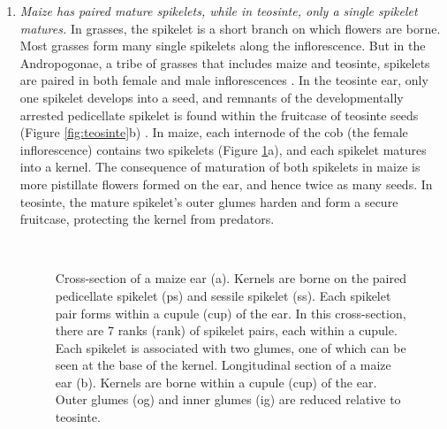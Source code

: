 \documentclass[a4paper]{article}
\begin{document}
\begin{enumerate}

﻿ \item \textit{Maize has paired mature spikelets, while in teosinte, only a single spikelet matures.}
 In grasses, the spikelet is a short branch on which flowers are borne.
 Most grasses form many single spikelets along the inflorescence.
 But in the Andropogonae, a tribe of grasses that includes maize and teosinte, spikelets are paired in both female and male inflorescences \citep{kellogg2000, wu2009}.
﻿In the teosinte ear, only one spikelet develops into a seed, and remnants of the developmentally arrested pedicellate spikelet is found within the fruitcase of teosinte seeds (Figure \ref{fig:teosinte}b) \citep{weatherwax1935, sundberg1990, doebley1995sos1}.
 In maize, each internode of the cob (the female inflorescence) contains two spikelets (Figure \ref{fig:maize}a), and each spikelet matures into a kernel.
 The consequence of maturation of both spikelets in maize is more pistillate flowers formed on the ear, and hence twice as many seeds.
 In teosinte, the mature spikelet's outer glumes harden and form a secure fruitcase, protecting the  kernel from predators.

﻿   \begin{figure}
        \caption{\label{fig:maize} Cross-section of a maize ear (a). Kernels are borne on the paired pedicellate spikelet (ps) and sessile spikelet (ss). Each spikelet pair forms within a cupule (cup) of the ear. In this cross-section, there are 7 ranks (rank) of spikelet pairs, each within a cupule. Each spikelet is associated with two glumes, one of which can be seen at the base of the kernel.
        ﻿Longitudinal section of a maize ear (b). Kernels are borne within a cupule (cup) of the ear. Outer glumes (og) and inner glumes (ig) are reduced relative to teosinte.}
\end{figure}



\end{enumerate}
\end{document}
